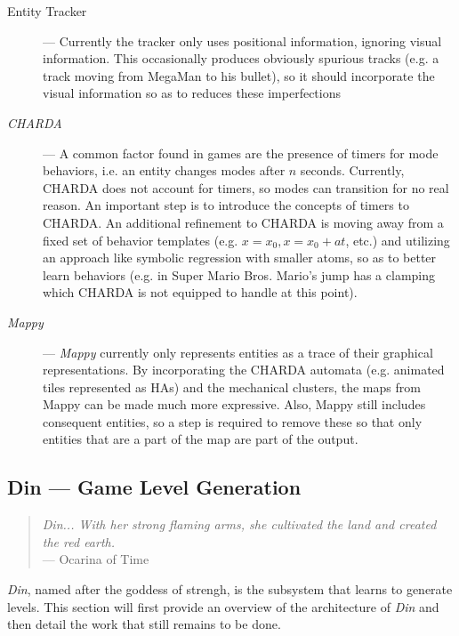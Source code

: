 \documentclass[a4paper]{article}
\begin{document}
\begin{description}
\item[Entity Tracker] --- Currently the tracker only uses positional information, ignoring visual information.  This occasionally produces obviously spurious tracks (e.g. a track moving from MegaMan to his bullet), so it should incorporate the visual information so as to reduces these imperfections

\item[\textit{CHARDA}] --- A common factor found in games are the presence of timers for mode behaviors, i.e. an entity changes modes after $n$ seconds.  Currently, CHARDA does not account for timers, so modes can transition for no real reason.  An important step is to introduce the concepts of timers to CHARDA.  An additional refinement to CHARDA is moving away from a fixed set of behavior templates (e.g. $x = x_0, x = x_0 + at$, etc.) and utilizing an approach like symbolic regression with smaller atoms, so as to better learn behaviors (e.g. in Super Mario Bros. Mario's jump has a clamping which CHARDA is not equipped to handle at this point).

\item[\textit{Mappy}] --- \textit{Mappy} currently only represents entities as a trace of their graphical representations.  By incorporating the CHARDA automata (e.g. animated tiles represented as HAs) and the mechanical clusters, the maps from Mappy can be made much more expressive. Also, Mappy still includes consequent entities, so a step is required to remove these so that only entities that are a part of the map are part of the output.



\end{description}



\subsection{Din --- Game Level Generation}
\begin{quotation}
\textit{ Din... With her strong flaming arms, she cultivated the land and created the red earth.} \\ \indent \indent --- Ocarina of Time
\end{quotation}

\textit{Din}, named after the goddess of strengh, is the subsystem that learns to generate levels.  This section will first provide an overview of the architecture of \textit{Din} and then detail the work that still remains to be done.
\end{document}
